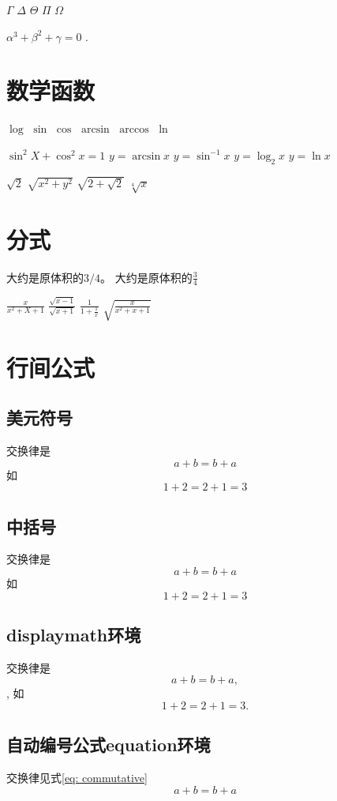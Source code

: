 \documentclass{article}%
\begin{document}
	$\Gamma$
	$\Delta$
	$\Theta$
	$\Pi$
	$\Omega$
	
	$\alpha^3 + \beta^2 + \gamma = 0$ .
	\section{数学函数}
	$\log$
	$\sin$
	$\cos$
	$\arcsin$
	$\arccos$
	$\ln$
	
	$\sin^2 X + \cos^2 x = 1$
	$y =\arcsin x$
	$y = \sin^{-1} x$
	$y=\log_2 x$
	$y = \ln x$
	
	$\sqrt{2}$
	$\sqrt{x^2 + y^2}$
	$\sqrt{2 + \sqrt{2}}$
	$\sqrt[4]{x}$
	
	\section{分式}
	大约是原体积的$3/4$。
	大约是原体积的$\frac{3}{4}$
	
	$\frac{x}{x^2 + X+ 1}$
	$\frac{\sqrt{x-1}}{\sqrt{x+1}}$
	$\frac{1}{1 + \frac{1}{x}}$
	$\sqrt{\frac{x}{x^2 + x + 1}}$
	
	\section{行间公式}
	\subsection{美元符号}
	交换律是
	$$a+b=b+a$$
	如
	$$1+2=2+1=3$$
	\subsection{中括号}
	交换律是
	\[a+b=b+a\]
	如
	\[1+2=2+1=3\]
	
	\subsection{displaymath环境}
	交换律是
	\begin{displaymath}
		a+b=b+a ,
	\end{displaymath},
	如
	\begin{displaymath}
		1+2=2+1=3.
	\end{displaymath}

	\subsection{自动编号公式equation环境}
	交换律见式\ref{eq: commutative}%
	\begin{equation}
		a+b=b+a \label{eq: commutative}%
	\end{equation}
\end{document}
